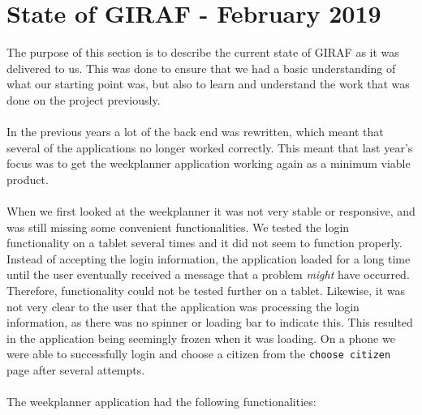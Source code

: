 \section{State of GIRAF - February 2019}\label{sec:stateOfGirafFeb2019}
The purpose of this section is to describe the current state of GIRAF as it was delivered to us.
This was done to ensure that we had a basic understanding of what our starting point was, but also to learn and understand the work that was done on the project previously.
\\\\
In the previous years a lot of the back end was rewritten, which meant that several of the applications no longer worked correctly.
This meant that last year's focus was to get the weekplanner application working again as a minimum viable product.
\\\\
When we first looked at the weekplanner it was not very stable or responsive, and was still missing some convenient functionalities.
We tested the login functionality on a tablet several times and it did not seem to function properly.
Instead of accepting the login information, the application loaded for a long time until the user eventually received a message that a problem \textit{might} have occurred.
Therefore, functionality could not be tested further on a tablet.
Likewise, it was not very clear to the user that the application was processing the login information, as there was no spinner or loading bar to indicate this.
This resulted in the application being seemingly frozen when it was loading.
On a phone we were able to successfully login and choose a citizen from the \texttt{choose citizen} page after several attempts.
\\\\
The weekplanner application had the following functionalities:
